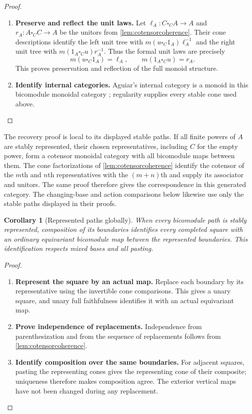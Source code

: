 \documentclass[11pt,reqno]{amsart}
\theoremstyle{plain}
\newtheorem{corollary}[theorem]{Corollary}
\theoremstyle{definition}
\theoremstyle{remark}
\numberwithin{equation}{section}
\begin{document}
\begin{proof}
\begin{enumerate}
\item \textbf{Preserve and reflect the unit laws.} Let $\ell_A:C\square_C A\to A$ and $r_A:A\square_C C\to A$
be the unitors from \cref{lem:cotensorcoherence}. Their cone
descriptions identify the left unit tree with
$m(u\square_C1_A)\ell_A^{-1}$ and the right unit tree with
$m(1_A\square_Cu)r_A^{-1}$. Thus the formal unit laws are precisely
\[
 m(u\square_C1_A)=\ell_A,\qquad
 m(1_A\square_Cu)=r_A.
\]
This proves preservation and reflection of the full monoid structure.

\item \textbf{Identify internal categories.} Aguiar's internal category is a monoid in this bicomodule monoidal
category \cite[Theorem 2.2.1 and Definition 2.3.1]{Aguiar1997};
regularity supplies every stable cone used above.\qedhere
\end{enumerate}
\end{proof}

The recovery proof is local to its displayed stable paths. If all finite
powers of $A$ are stably represented, their chosen representatives,
including $C$ for the empty power, form a cotensor monoidal category with
all bicomodule maps between them. The cone factorizations of
\cref{lem:cotensorcoherence} identify the cotensor of the $m$th and $n$th
representatives with the $(m+n)$th and supply its associator and unitors.
The same proof therefore gives the correspondence in this generated
category. The changing-base and action comparisons below likewise use
only the stable paths displayed in their proofs.

\begin{corollary}[Represented paths globally]\label{cor:globalrepresented}
When every bicomodule path is stably represented, composition of its
boundaries identifies every completed square with an ordinary
equivariant bicomodule map between the represented boundaries.
This identification respects mixed bases and all pasting.
\end{corollary}
\begin{proof}\leavevmode
\begin{enumerate}
\item \textbf{Represent the square by an actual map.} Replace each boundary by its representative using the invertible cone
comparisons. This gives a unary square, and unary full faithfulness
identifies it with an actual equivariant map.

\item \textbf{Prove independence of replacements.} Independence from
parenthesization and from the sequence of replacements follows from
\cref{lem:cotensorcoherence}.

\item \textbf{Identify composition over the same boundaries.} For adjacent squares, pasting the
representing cones gives the representing cone of their composite;
uniqueness therefore makes composition agree. The exterior vertical
maps have not been changed during any replacement.\qedhere
\end{enumerate}
\end{proof}
\end{document}
